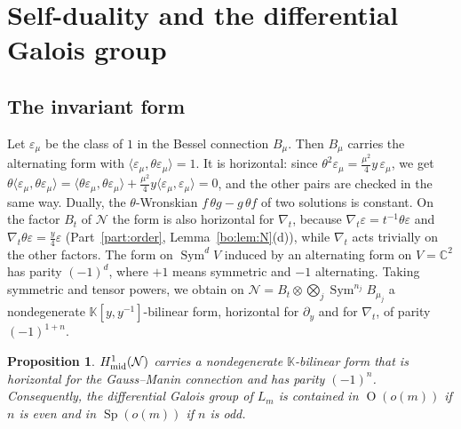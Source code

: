 \documentclass[11pt,a4paper]{article}
\newtheorem{proposition}[theorem]{Proposition}
\theoremstyle{definition}
\theoremstyle{remark}
\numberwithin{equation}{section}
\newcommand{\C}{\mathbb{C}}
\newcommand{\Kt}{\mathbb{K}}
\newcommand{\cN}{\mathcal{N}}
\DeclareMathOperator{\Sym}{Sym}
\DeclareMathOperator{\Ort}{O}
\DeclareMathOperator{\Sp}{Sp}
\begin{document}
\section{Self-duality and the differential Galois group}\label{bs:sec:galois}

\subsection{The invariant form}
Let $\varepsilon_\mu$ be the class of $1$ in the Bessel connection $B_\mu$. Then $B_\mu$ carries the alternating form with $\langle\varepsilon_\mu,\theta\varepsilon_\mu\rangle=1$. It is horizontal: since $\theta^2\varepsilon_\mu=\frac{\mu^2}4y\,\varepsilon_\mu$, we get $\theta\langle\varepsilon_\mu,\theta\varepsilon_\mu\rangle=\langle\theta\varepsilon_\mu,\theta\varepsilon_\mu\rangle+\frac{\mu^2}4y\langle\varepsilon_\mu,\varepsilon_\mu\rangle=0$, and the other pairs are checked in the same way. Dually, the $\theta$-Wronskian $f\,\theta g-g\,\theta f$ of two solutions is constant. On the factor $B_t$ of $\cN$ the form is also horizontal for $\nabla_t$, because $\nabla_t\varepsilon=t^{-1}\theta\varepsilon$ and $\nabla_t\theta\varepsilon=\frac y4\varepsilon$ (Part~\ref{part:order}, Lemma~\ref{bo:lem:N}(d)), while $\nabla_t$ acts trivially on the other factors. The form on $\Sym^dV$ induced by an alternating form on $V=\C^2$ has parity $(-1)^d$, where $+1$ means symmetric and $-1$ alternating. Taking symmetric and tensor powers, we obtain on $\cN=B_t\otimes\bigotimes_j\Sym^{n_j}B_{\mu_j}$ a nondegenerate $\Kt[y,y^{-1}]$-bilinear form, horizontal for $\partial_y$ and for $\nabla_t$, of parity $(-1)^{1+n}$.

\begin{proposition}\label{bs:prop:dual}
$H^1_{\rm mid}(\cN)$ carries a nondegenerate $\Kt$-bilinear form that is horizontal for the Gauss--Manin connection and has parity $(-1)^n$. Consequently, the differential Galois group of $L_m$ is contained in $\Ort(o(m))$ if $n$ is even and in $\Sp(o(m))$ if $n$ is odd.
\end{proposition}
\end{document}
